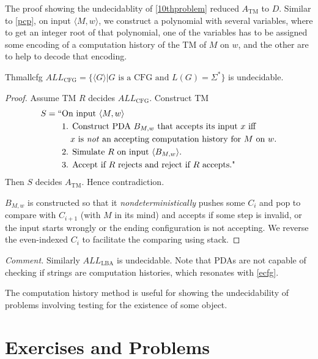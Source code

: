 The proof showing the undecidablity of \ref{10thproblem} reduced $A_{\mathrm{TM}}$ to $D$. Similar to \ref{pcp}, on input $\langle M,w\rangle$, we construct a polynomial with several variables, where to get an integer root of that polynomial, one of the variables has to be assigned some encoding of a computation history of the TM of $M$ on $w$, and the other are to help to decode that encoding.

\begin{reference}{Thm}{allcfg}
  $ALL_{\mathrm{CFG}}=\{\langle G\rangle|G\text{ is a CFG and }L(G)=\Sigma^*\}$ is undecidable.
\end{reference}

\begin{proof}
  Assume TM $R$ decides $ALL_{\mathrm{CFG}}$. Construct TM
  \begin{align*}
    S=\text{``} & \text{On input }\langle M,w\rangle                                                 \\
                & \text{1. Construct PDA }B_{M,w}\text{ that accepts its input }x\text{ iff }        \\
                & \quad x\text{ is \textit{not} an accepting computation history for }M\text{ on }w. \\
                & \text{2. Simulate }R\text{ on input }\langle B_{M,w}\rangle.                       \\
                & \text{3. Accept if }R\text{ rejects and reject if }R\text{ accepts."}
  \end{align*}
  Then $S$ decides $A_{\mathrm{TM}}$. Hence contradiction.

  $B_{M,w}$ is constructed so that it \textit{nondeterministically} pushes some $C_i$ and pop to compare with $C_{i+1}$ (with $M$ in its mind) and accepts if some step is invalid, or the input starts wrongly or the ending configuration is not accepting. We reverse the even-indexed $C_i$ to facilitate the comparing using stack.
\end{proof}

\textit{Comment.} Similarly $ALL_{\mathrm{LBA}}$ is undecidable. Note that PDAs are not capable of checking if strings are computation histories, which resonates with \ref{ecfg}.

The computation history method is useful for showing the undecidability of problems involving testing for the existence of some object.

\section*{Exercises and Problems}

